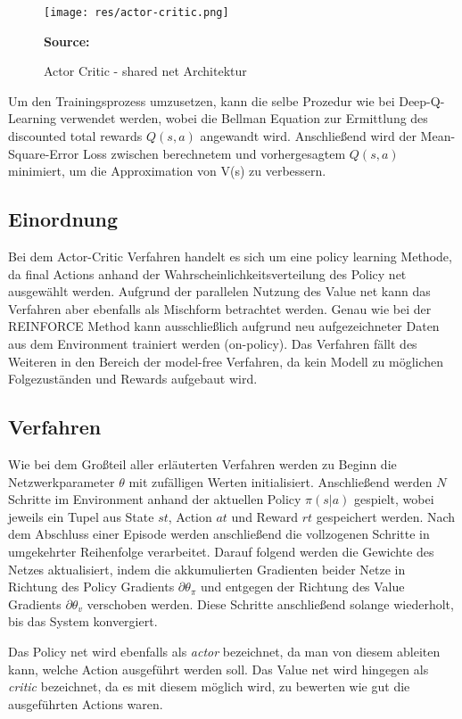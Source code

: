 \documentclass[11pt]{scrartcl}
\newcommand{\source}[1]{\vspace{-5pt} \caption*{\hfill \textbf{Source:} {#1}} }
\begin{document}
\begin{figure}[htp]
\centering
\texttt{[image: res/actor-critic.png]}
\caption{Actor Critic - shared net Architektur}
\source{\cite[~S.268 - Chapter 10 - Figure 5]{L2018}}
\label{fig:actor-critic}
\end{figure}

\newpage
Um den Trainingsprozess umzusetzen, kann die selbe Prozedur wie bei Deep-Q-Learning verwendet werden, wobei
die Bellman Equation zur Ermittlung des discounted total rewards $Q(s,a)$ angewandt wird. Anschließend wird
der Mean-Square-Error Loss zwischen berechnetem und vorhergesagtem $Q(s,a)$ minimiert, um die Approximation
von V(s) zu verbessern.


\subsection{Einordnung}
Bei dem Actor-Critic Verfahren handelt es sich um eine policy learning Methode, da final Actions anhand der
Wahrscheinlichkeitsverteilung des Policy net ausgewählt werden. Aufgrund der parallelen Nutzung des Value
net kann das Verfahren aber ebenfalls als Mischform betrachtet werden. Genau wie bei der REINFORCE Method
kann ausschließlich aufgrund neu aufgezeichneter Daten aus dem Environment trainiert werden (on-policy).
Das Verfahren fällt des Weiteren in den Bereich der model-free Verfahren, da kein Modell zu möglichen
Folgezuständen und Rewards aufgebaut wird. 

\subsection{Verfahren}
Wie bei dem Großteil aller erläuterten Verfahren werden zu Beginn die Netzwerkparameter $\theta$ mit
zufälligen Werten initialisiert. Anschließend werden $N$ Schritte im Environment anhand der aktuellen
Policy $\pi(s|a)$ gespielt, wobei jeweils ein Tupel aus State $st$, Action $at$ und Reward $rt$
gespeichert werden. Nach dem Abschluss einer Episode werden anschließend die vollzogenen Schritte in
umgekehrter Reihenfolge verarbeitet. Darauf folgend werden die Gewichte des Netzes aktualisiert, indem
die akkumulierten Gradienten beider Netze in Richtung des Policy Gradients $\partial\theta_\pi$
und entgegen der Richtung des Value Gradients $\partial\theta_v$ verschoben werden. Diese Schritte
anschließend solange wiederholt, bis das System konvergiert.

Das Policy net wird ebenfalls als \textit{actor} bezeichnet, da man von diesem ableiten kann, welche
Action ausgeführt werden soll. Das Value net wird hingegen als \textit{critic} bezeichnet, da es mit
diesem möglich wird, zu bewerten wie gut die ausgeführten Actions waren.
\end{document}
